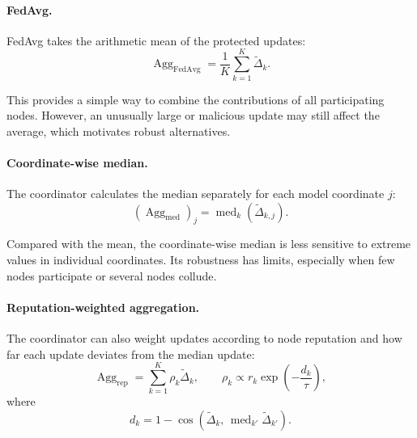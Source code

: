 \documentclass[11pt,a4paper]{article}
\begin{document}
\paragraph{FedAvg.}

FedAvg takes the arithmetic mean of the protected updates:
\begin{equation}
\operatorname{Agg}_{\mathrm{FedAvg}}
=
\frac{1}{K}\sum_{k=1}^{K}
\widetilde{\Delta}_k.
\label{eq:protocol-fedavg}
\end{equation}

This provides a simple way to combine the contributions of all
participating nodes. However, an unusually large or malicious update
may still affect the average, which motivates robust alternatives.

\paragraph{Coordinate-wise median.}

The coordinator calculates the median separately for each model
coordinate $j$:
\begin{equation}
\left(\operatorname{Agg}_{\mathrm{med}}\right)_j
=
\operatorname{med}_{k}
\left(\widetilde{\Delta}_{k,j}\right).
\label{eq:protocol-coordinate-median}
\end{equation}

Compared with the mean, the coordinate-wise median is less sensitive
to extreme values in individual coordinates. Its robustness has
limits, especially when few nodes participate or several nodes
collude.

\paragraph{Reputation-weighted aggregation.}

The coordinator can also weight updates according to node reputation
and how far each update deviates from the median update:
\begin{equation}
\operatorname{Agg}_{\mathrm{rep}}
=
\sum_{k=1}^{K}\rho_k\widetilde{\Delta}_k,
\qquad
\rho_k\propto r_k\exp\!\left(-\frac{d_k}{\tau}\right),
\label{eq:protocol-reputation-aggregation}
\end{equation}
where
\begin{equation}
d_k =
1-\cos\!\left(
\widetilde{\Delta}_k,\,
\operatorname{med}_{k'}
\widetilde{\Delta}_{k'}
\right).
\label{eq:protocol-update-distance}
\end{equation}
\end{document}
